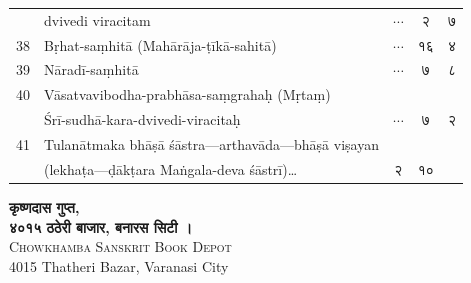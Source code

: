 \documentclass[11pt,a4paper]{article}
\newcommand{\dev}[1]{{\devanagarifont #1}}
\begin{document}
\begin{longtable}{r p{8cm} c c}
   & dvivedi viracitam & $\cdots$ & २ & ७ \\
38 & Bṛhat-saṃhitā (Mahārāja-ṭīkā-sahitā) & $\cdots$ & १६ & ४ \\
39 & Nāradī-saṃhitā & $\cdots$ & ७ & ८ \\
40 & Vāsatvavibodha-prabhāsa-saṃgrahaḥ (Mṛtaṃ)\\
   & Śrī-sudhā-kara-dvivedi-viracitaḥ & $\cdots$ & ७ & २ \\
41 & Tulanātmaka bhāṣā śāstra—arthavāda—bhāṣā viṣayan\\
   & (lekhaṭa—ḍākṭara Maṅgala-deva śāstrī)\ldots & २ & १० \\
\bottomrule
\end{longtable}

\vfill
\begin{center}
\textbf{\dev{कृष्णदास गुप्त,}}\\
\textbf{४०१५ ठठेरी बाजार, बनारस सिटी ।}\\[0.5em]
\textsc{Chowkhamba Sanskrit Book Depot}\\
4015 Thatheri Bazar, Varanasi City
\end{center}

\end{document}
